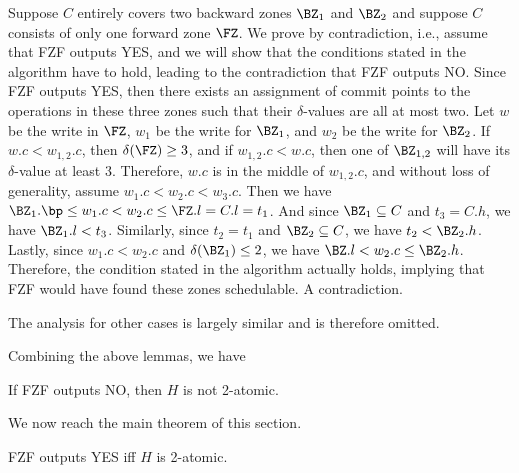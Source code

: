 {Suppose $C$ entirely covers two backward zones $\BZ_1$ and $\BZ_2$ and
suppose $C$ consists of only one forward zone $\FZ$.  We prove by
contradiction, i.e., assume that FZF outputs YES, and we will show
that the conditions stated in the algorithm have to hold, leading to
the contradiction that FZF outputs NO.  Since FZF outputs YES, then
there exists an assignment of commit points to the operations in these
three zones such that their $\delta$-values are all at most two.  Let
$w$ be the write in $\FZ$, $w_1$ be the write for $\BZ_1$, and $w_2$
be the write for $\BZ_2$.  If $w.c < w_{1,2}.c$, then $\delta(\FZ)
\geq 3$, and if $w_{1,2}.c < w.c$, then one of $\BZ_{1,2}$ will have
its $\delta$-value at least 3.  Therefore, $w.c$ is in the middle of
$w_{1,2}.c$, and without loss of generality, assume $w_1.c < w_2.c <
w_3.c$.  Then we have $\BZ_1.\bp \leq w_1.c < w_2.c \leq \FZ.l = C.l =
t_1$.  And since $\BZ_1 \subseteq C$ and $t_3 = C.h$, we have $\BZ_1.l
< t_3$.  Similarly, since $t_2 = t_1$ and $\BZ_2 \subseteq C$, we have
$t_2 < \BZ_2.h$.  Lastly, since $w_1.c < w_2.c$ and $\delta(\BZ_1)
\leq 2$, we have $\BZ.l < w_2.c \leq \BZ_2.h$.  Therefore, the
condition stated in the algorithm actually holds, implying that FZF
would have found these zones schedulable.  A contradiction.

The analysis for other cases is largely similar and is therefore
omitted.  \QED

Combining the above lemmas, we have

\begin{lemma}
  \label{lemma:???}
  If FZF outputs NO, then $H$ is not 2-atomic.
\end{lemma}

We now reach the main theorem of this section.

\begin{theorem}
  \label{thm:???}
  FZF outputs YES iff $H$ is 2-atomic.
\end{theorem}
}

